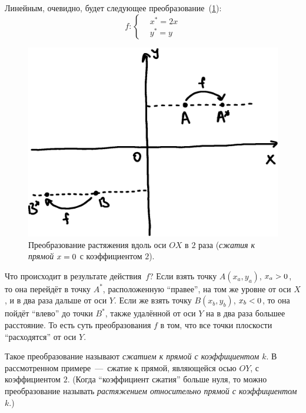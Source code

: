 \documentclass[a4paper,12pt]{article}
\begin{document}
  \begin{example}
    Линейным, очевидно, будет следующее преобразование~(\ref{fig:linear-example}):
    \begin{equation}\label{eq:linear-example}
      f\colon \left\{
        \begin{aligned}
          &x^* = 2x\\
          &y^* = y
        \end{aligned}
      \right.
    \end{equation}
    
    \begin{figure}
      \centering
      
      \includegraphics[width=0.6\columnwidth]{linear-example}
      
      \caption{Преобразование растяжения вдоль оси $OX$ в $2$ раза (\emph{сжатия к прямой} $x \hm= 0$ с коэффициентом $2$).}
      \label{fig:linear-example}
    \end{figure}
    
    Что происходит в результате действия~$f$?
    Если взять точку $A(x_a, y_a)$, $x_a \hm> 0$, то она перейдёт в точку $A^*$, расположенную ``правее'', на том же уровне от оси $X$, и в два раза дальше от оси $Y$.
    Если же взять точку $B(x_b, y_b)$, $x_b \hm< 0$, то она пойдёт ``влево'' до точки $B^*$, также удалённой от оси $Y$ на в два раза большее расстояние.
    То есть суть преобразования $f$ в том, что все точки плоскости ``расходятся'' от оси $Y$.
    
    Такое преобразование называют \emph{сжатием к прямой с коэффициентом $k$}.
    В рассмотренном примере~---~сжатие к прямой, являющейся осью $OY$, с коэффициентом $2$.
    (Когда ``коэффициент сжатия'' больше нуля, то можно преобразование называть \emph{растяжением относительно прямой с коэффициентом $k$}.)
  \end{example}
  
\end{document}
